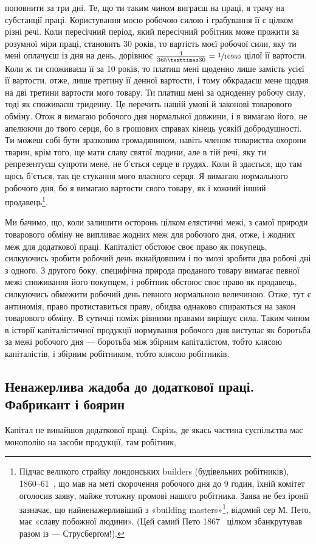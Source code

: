 \parcont{}  %
поповнити за три дні. Те, що ти таким чином виграєш на праці,
я трачу на субстанції праці. Користування моєю робочою силою
і грабування її є цілком різні речі. Коли пересічний період,
який пересічний робітник може прожити за розумної міри праці,
становить 30 років, то вартість моєї робочої сили, яку ти мені
оплачуєш із дня на день, дорівнює $\frac{1}{365×30} = \sfrac{1}{10950}$ цілої її
вартости. Коли ж ти споживаєш її за 10 років, то платиш мені
щоденно лише  замість  усієї її вартости, отже, лише
третину її денної вартости, і тому обкрадаєш мене щодня на дві
третини вартости мого товару. Ти платиш мені за одноденну
робочу силу, тоді як споживаєш триденну. Це перечить нашій
умові й законові товарового обміну. Отож я вимагаю робочого
дня нормальної довжини, і я вимагаю його, не апелюючи до твого
серця, бо в грошових справах кінець усякій добродушності.
Ти можеш собі бути зразковим громадянином, навіть членом
товариства охорони тварин, крім того, ще мати славу святої
людини, але в тій речі, яку ти репрезентуєш супроти мене, не
б’ється серце в грудях. Коли й здається, що там щось б’ється,
так це стукання мого власного серця. Я вимагаю нормального
робочого дня, бо я вимагаю вартости свого товару, як і кожний
інший продавець\footnote{
Підчас великого страйку лондонських builders (будівельних робітників),
1860--61~, що мав на меті скорочення робочого дня до 9 годин,
їхній комітет оголосив заяву, майже тотожну промові нашого робітника.
Заява не без іронії зазначає, що найненажерливіший з «building
masters»\footnote*{— будівельних підприємців. \emph{Ред.}
}, відомий сер М. Пето, має «славу побожної людини». (Цей
самий Пето 1867~ цілком збанкрутував разом із — Струсберґом!).
}.

Ми бачимо, що, коли залишити осторонь цілком елястичні
межі, з самої природи товарового обміну не випливає жодних
меж для робочого дня, отже, і жодних меж для додаткової праці.
Капіталіст обстоює своє право як покупець, силкуючись зробити
робочий день якнайдовшим і по змозі зробити два робочі дні з
одного. З другого боку, специфічна природа проданого товару
вимагає певної межі споживання його покупцем, і робітник обстоює
своє право як продавець, силкуючись обмежити робочий день
певного нормальною величиною. Отже, тут є антиномія, право
протиставиться праву, обидва однаково спираються на закон
товарового обміну. В сутичці поміж рівними правами вирішує
сила. Таким чином в історії капіталістичної продукції нормування
робочого дня виступає як боротьба за межі робочого дня —
боротьба між збірним капіталістом, тобто клясою капіталістів,
і збірним робітником, тобто клясою робітників.

\subsection{ Ненажерлива жадоба до додаткової праці. Фабрикант і боярин}

Капітал не винайшов додаткової праці. Скрізь, де якась частина
суспільства має монополію на засоби продукції, там робітник,
\parbreak{}  %

